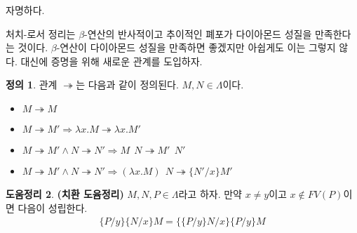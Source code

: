 \documentclass[b5paper, 11pt]{book}
\theoremstyle{definition}
\newtheorem{defn}{정의}[chapter]
\newtheorem{lem}[defn]{도움정리}
\newenvironment{pf*}{\pushQED{\qed}\pf}
{\popQED\endpf}
\begin{document}
\begin{pf*}
    자명하다.
\end{pf*}
처치-로서 정리는 $\beta$-연산의 반사적이고 추이적인 폐포가 다이아몬드 성질을 만족한다는 것이다. $\beta$-연산이 다이아몬드 성질을 만족하면 좋겠지만 아쉽게도 이는 그렇지 않다. 대신에 증명을 위해 새로운 관계를 도입하자.
\begin{defn}
    관계 $\twoheadrightarrow$는 다음과 같이 정의된다. $M,N \in \Lambda$이다.
    \begin{itemize}
        \item $M \twoheadrightarrow M $
        \item $M \twoheadrightarrow M' \Rightarrow 
        \lambda x. M \twoheadrightarrow \lambda x. M'$
        \item $M \twoheadrightarrow M' \wedge N \twoheadrightarrow N' \Rightarrow
        M \;\, N \twoheadrightarrow M' \;\, N' $
        \item $M \twoheadrightarrow M' \wedge N \twoheadrightarrow N' \Rightarrow
        (\lambda x. M)\;\, N \twoheadrightarrow \{N'/x\}M'$
    \end{itemize}
\end{defn}
\begin{lem}
    \textbf{(치환 도윰정리)} $M, N, P \in \Lambda$라고 하자. 만약 $x \neq y$이고 $x \notin
    FV(P)$이면 다음이 성립한다.
    \begin{align*}
        \{P / y\} \{ N / x\} M = \{ \{P / y\} N / x \} \{P / y\}  M
    \end{align*}
\end{lem}
\end{document}
